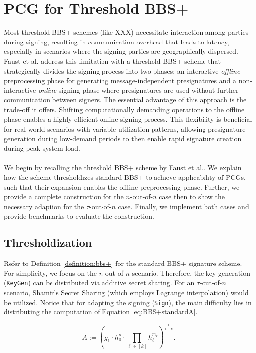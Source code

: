 \chapter{PCG for Threshold BBS+}
Most threshold BBS+ schemes (like XXX) necessitate interaction among parties during signing, resulting in communication overhead that leads to latency, especially in scenarios where the signing parties are geographically dispersed. Faust et al. \cite{cryptoeprint:2023/1076} address this limitation with a threshold BBS+ scheme that strategically divides the signing process into two phases: an interactive \textit{offline} preprocessing phase for generating message-independent presignatures and a non-interactive \textit{online} signing phase where presignatures are used without further communication between signers. The essential advantage of this approach is the trade-off it offers. Shifting computationally demanding operations to the offline phase enables a highly efficient online signing process. This flexibility is beneficial for real-world scenarios with variable utilization patterns, allowing presignature generation during low-demand periods to then enable rapid signature creation during peak system load. 
\\\\
We begin by recalling the threshold BBS+ scheme by Faust et al.. We explain how the scheme thresholdizes standard BBS+ to achieve applicability of PCGs, such that their expansion enables the offline preprocessing phase. Further, we provide a complete construction for the $n$-out-of-$n$ case then to show the necessary adaption for the $\tau$-out-of-$n$ case. Finally, we implement both cases and provide benchmarks to evaluate the construction.

\section{Thresholdization}
Refer to Definition \ref{definition:bbs+} for the standard BBS+ signature scheme. For simplicity, we focus on the $n$-out-of-$n$ scenario. Therefore, the key generation (\texttt{\textup{KeyGen}}) can be distributed via additive secret sharing. For an $\tau$-out-of-$n$ scenario, Shamir's Secret Sharing  \cite{shamir1979share} (which employs Lagrange interpolation) would be utilized. Notice that for adapting the signing (\texttt{\textup{Sign}}), the main difficulty lies in distributing the computation of Equation \ref{eq:BBS+standardA}.

\begin{equation}
A := \left( g_1\cdot h_0^s\cdot \prod_{\ell \in [k]} h_{\ell}^{m_{\ell}} \right)^{\frac{1}{x+e}}.
\label{eq:BBS+standardA}
\end{equation}

